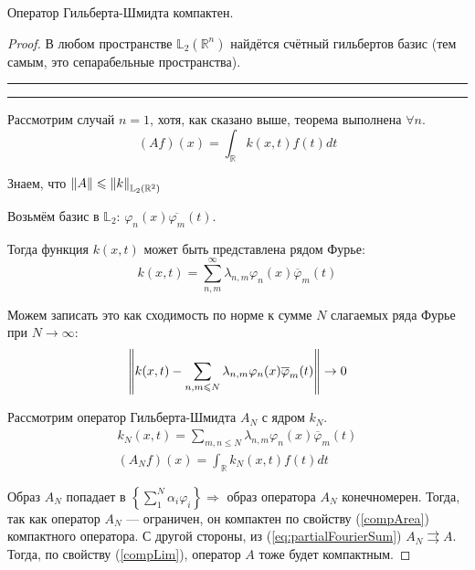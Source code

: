 \documentclass[12pt]{article}
\begin{document}
	\begin{state}
		Оператор Гильберта-Шмидта компактен.
	\end{state}
	\begin{proof}
		В любом пространстве $\mathbb{L}_2(\mathbb{R}^n)$ найдётся счётный гильбертов базис 
		(тем самым, это сепарабельные пространства).
		
		\vspace{2pt}\hrule\vspace{2pt}
		
		
		
		\vspace{2pt}\hrule\vspace{2pt}
		
		Рассмотрим случай $n=1$, хотя, как сказано выше, теорема выполнена $\forall n$. 
		$$(Af)(x) = \int_{\mathbb{R}} k(x,t) f(t) dt$$
		
		Знаем, что $\left\| A \right\| \leqslant \left\| k \right\|_{\mathbb{L}_2(\mathbb{R}^2)}$
		
		Возьмём базис в $\mathbb{L}_2$: $\varphi_n(x)\overline{\varphi_m}(t)$.
		
		Тогда функция $k(x,t)$ может быть представлена рядом Фурье:
		$$k(x,t) = \sum_{n,m}^{\infty}\lambda_{n,m}\varphi_n(x)\overline{\varphi}_m(t)$$
		
		Можем записать это как сходимость по норме к сумме $N$ слагаемых ряда Фурье при $N \rightarrow \infty$:
		\begin{equation} \label{eq:partialFourierSum}
			\left\| k(x,t) - \sum_{n,m\leqslant N}\lambda_{n,m}\varphi_n(x)\overline{\varphi}_m(t) \right\| \rightarrow 0
		\end{equation}
		
		Рассмотрим оператор Гильберта-Шмидта $A_N$ с ядром $k_N$.
		\begin{gather}
			k_N(x,t) = \sum_{m,n \leq N} \lambda_{n,m} \varphi_n(x)\overline{\varphi}_m(t) \\
			(A_Nf)(x) = \int_{\mathbb{R}} k_N(x,t) f(t) dt
		\end{gather}
		
		Образ $A_N$ попадает в $\left\{\sum_1^N \alpha_i \varphi_i \right\} \Rightarrow$ образ оператора $A_N$ 
		конечномерен. Тогда, так как оператор $A_N$ --- ограничен, он компактен по свойству (\ref{compArea}) компактного оператора.
		С другой стороны, из (\ref{eq:partialFourierSum}) $A_N \rightrightarrows A$. Тогда, по свойству (\ref{compLim}), оператор
		$A$ тоже будет компактным.
	\end{proof}
\end{document}
